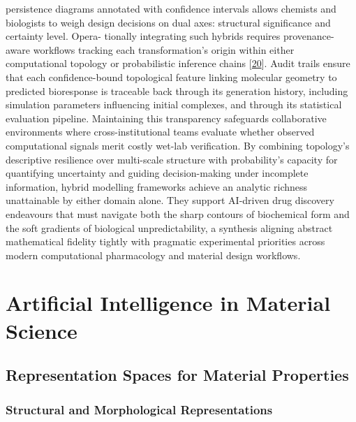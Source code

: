 \documentclass[
]{article}
\begin{document}
persistence diagrams annotated with confidence intervals allows chemists
and biologists to weigh design decisions on dual axes: structural
significance and certainty level. Opera- tionally integrating such
hybrids requires provenance-aware workflows tracking each
transformation's origin within either computational topology or
probabilistic inference chains {[}\hyperref[_bookmark60]{20}{]}. Audit
trails ensure that each confidence-bound topological feature linking
molecular geometry to predicted bioresponse is traceable back through
its generation history, including simulation parameters influencing
initial complexes, and through its statistical evaluation pipeline.
Maintaining this transparency safeguards collaborative environments
where cross-institutional teams evaluate whether observed computational
signals merit costly wet-lab verification. By combining topology's
descriptive resilience over multi-scale structure with probability's
capacity for quantifying uncertainty and guiding decision-making under
incomplete information, hybrid modelling frameworks achieve an analytic
richness unattainable by either domain alone. They support AI-driven
drug discovery endeavours that must navigate both the sharp contours of
biochemical form and the soft gradients of biological unpredictability,
a synthesis aligning abstract mathematical fidelity tightly with
pragmatic experimental priorities across modern computational
pharmacology and material design workflows.

\section{Artificial Intelligence in Material
Science}\label{artificial-intelligence-in-material-science}

\subsection{Representation Spaces for Material
Properties}\label{representation-spaces-for-material-properties}

\subsubsection{Structural and Morphological
Representations}\label{structural-and-morphological-representations}
\end{document}
